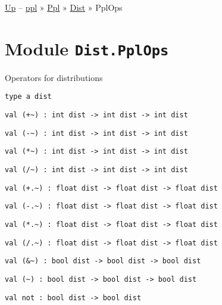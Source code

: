 \href{../index.html}{Up} -- \href{../../../index.html}{ppl} »
\href{../../index.html}{Ppl} » \href{../index.html}{Dist} » PplOps

\section{\texorpdfstring{Module
\texttt{Dist.PplOps}}{Module Dist.PplOps}}\label{module-dist.pplops}

Operators for distributions

\protect\hyperlink{type-dist}{}\texttt{type\ \textquotesingle{}a\ dist}

\protect\hyperlink{val-ux28+ux7eux29}{}\texttt{val\ (+\textasciitilde{})\ :\ int\ dist\ -\textgreater{}\ int\ dist\ -\textgreater{}\ int\ dist}

\protect\hyperlink{val-ux28-ux7eux29}{}\texttt{val\ (-\textasciitilde{})\ :\ int\ dist\ -\textgreater{}\ int\ dist\ -\textgreater{}\ int\ dist}

\protect\hyperlink{val-ux28ux2aux7eux29}{}\texttt{val\ (*\textasciitilde{})\ :\ int\ dist\ -\textgreater{}\ int\ dist\ -\textgreater{}\ int\ dist}

\protect\hyperlink{val-ux28ux2fux7eux29}{}\texttt{val\ (/\textasciitilde{})\ :\ int\ dist\ -\textgreater{}\ int\ dist\ -\textgreater{}\ int\ dist}

\protect\hyperlink{val-ux28+.ux7eux29}{}\texttt{val\ (+.\textasciitilde{})\ :\ float\ dist\ -\textgreater{}\ float\ dist\ -\textgreater{}\ float\ dist}

\protect\hyperlink{val-ux28-.ux7eux29}{}\texttt{val\ (-.\textasciitilde{})\ :\ float\ dist\ -\textgreater{}\ float\ dist\ -\textgreater{}\ float\ dist}

\protect\hyperlink{val-ux28ux2a.ux7eux29}{}\texttt{val\ (*.\textasciitilde{})\ :\ float\ dist\ -\textgreater{}\ float\ dist\ -\textgreater{}\ float\ dist}

\protect\hyperlink{val-ux28ux2f.ux7eux29}{}\texttt{val\ (/.\textasciitilde{})\ :\ float\ dist\ -\textgreater{}\ float\ dist\ -\textgreater{}\ float\ dist}

\protect\hyperlink{val-ux28ux5cux26ux7eux29}{}\texttt{val\ (\&\textasciitilde{})\ :\ bool\ dist\ -\textgreater{}\ bool\ dist\ -\textgreater{}\ bool\ dist}

\protect\hyperlink{val-ux28ux5cux257Cux7eux29}{}\texttt{val\ (\textbar{}\textasciitilde{})\ :\ bool\ dist\ -\textgreater{}\ bool\ dist\ -\textgreater{}\ bool\ dist}

\protect\hyperlink{val-not}{}\texttt{val\ not\ :\ bool\ dist\ -\textgreater{}\ bool\ dist}

